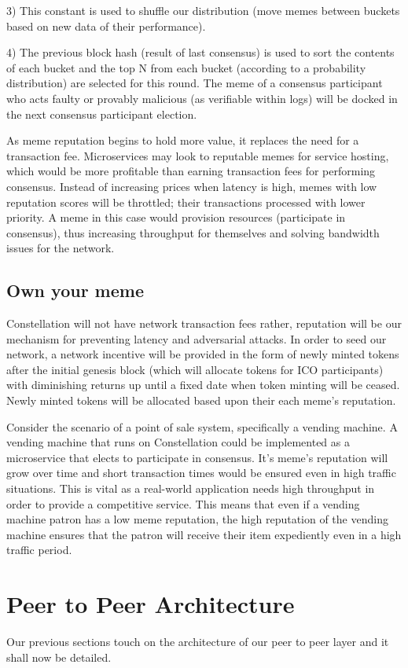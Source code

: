 \documentclass{article}
\begin{document}
3)	This constant is used to shuffle our distribution (move memes between buckets based on new data of their performance).

4)	The previous block hash (result of last consensus) is used to sort the contents of each bucket and the top N from each bucket (according to a probability distribution) are selected for this round. The meme of a consensus participant who acts faulty or provably malicious (as verifiable within logs) will be docked in the next consensus participant election.

As meme reputation begins to hold more value, it replaces the need for a transaction fee. Microservices may look to reputable memes for service hosting, which would be more profitable than earning transaction fees for performing consensus. Instead of increasing prices when latency is high, memes with low reputation scores will be throttled; their transactions processed with lower priority. A meme in this case would provision resources (participate in consensus), thus increasing throughput for themselves and solving bandwidth issues for the network.

 \subsection{Own your meme}
Constellation will not have network transaction fees rather, reputation will be our mechanism for preventing latency and adversarial attacks. In order to seed our network, a network incentive will be provided in the form of newly minted tokens after the initial genesis block (which will allocate tokens for ICO participants) with diminishing returns up until a fixed date when token minting will be ceased. Newly minted tokens will be allocated based upon their each meme's reputation.

Consider the scenario of a point of sale system, specifically a vending machine. A vending machine that runs on Constellation could be implemented as a microservice that elects to participate in consensus. It's meme's reputation will grow over time and short transaction times would be ensured even in high traffic situations. This is vital as a real-world application needs high throughput in order to provide a competitive service. This means that even if a vending machine patron has a low meme reputation, the high reputation of the vending machine ensures that the patron will receive their item expediently even in a high traffic period. 

\section{Peer to Peer Architecture}
Our previous sections touch on the architecture of our peer to peer layer and it shall now be detailed. 
\end{document}

